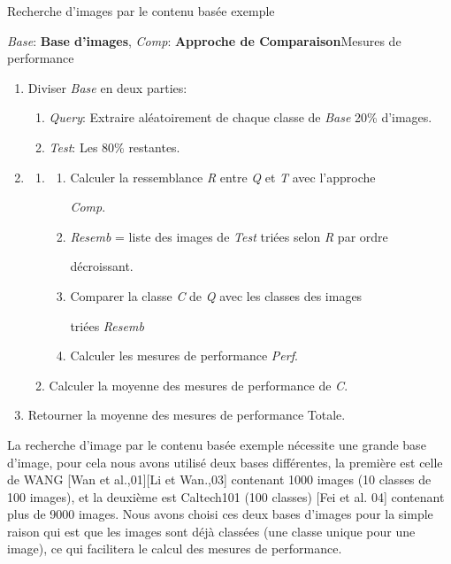 \begin{algorithme} 
\caption{Recherche d'images par le contenu basée exemple}
{\textit{Base}: \textbf{Base d'images}, \textit{Comp}: \textbf{Approche de Comparaison}}{Mesures de performance}
{
\begin{enumerate}


\item Diviser \textit{Base} en deux parties:
\begin{enumerate}[a]
\item \textit{Query}: Extraire aléatoirement de chaque classe de \textit{Base} 20\% d'images.
\item \textit{Test}: Les 80\% restantes.
\end{enumerate}

\item {}
{
\begin{enumerate}
\item {}
{
	\begin{enumerate}[a]
	\item {}
	{
		Calculer la ressemblance \textit{R} entre \textit{Q} et \textit{T} avec l'approche 
		
		\textit{Comp}.
	}
	\item \textit{Resemb} = liste des images de \textit{Test} triées selon \textit{R} par ordre 
	
	
	décroissant.
	\item Comparer la classe \textit{C} de \textit{Q} avec les classes des images 
	
	triées \textit{Resemb}
	\item Calculer les mesures de performance \textit{Perf}.
	\end{enumerate}
}
\item Calculer la moyenne des mesures de performance de \textit{C}.
\end{enumerate}
}
\item Retourner la moyenne des mesures de performance Totale.
\end{enumerate}
}
\end{algorithme}

	La recherche d'image par le contenu basée exemple nécessite une grande base d'image, pour cela nous avons utilisé deux bases différentes, la première est celle de WANG [Wan et al.,01][Li et Wan.,03] contenant 1000 images (10 classes de 100 images), et la deuxième est Caltech101 (100 classes) [Fei et al. 04] contenant plus de 9000 images. Nous avons choisi ces deux bases d'images pour la simple raison qui est que les images sont déjà classées (une classe unique pour une image), ce qui facilitera le calcul des mesures de performance.
	

